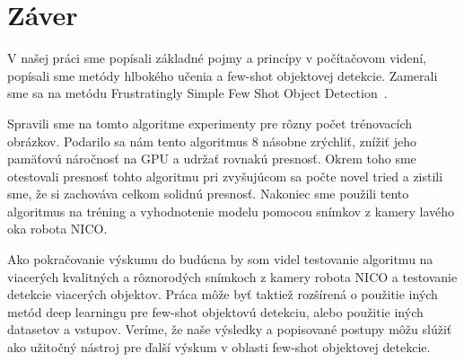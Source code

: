 \chapter*{Záver}\label{chap:conclusion}
V našej práci sme popísali základné pojmy a princípy v počítačovom videní, popísali sme metódy hlbokého učenia a few-shot objektovej detekcie. Zamerali sme sa na metódu Frustratingly Simple Few Shot Object Detection~\cite{FSFSODT}. 

Spravili sme na tomto algoritme experimenty pre rôzny počet trénovacích obrázkov. Podarilo sa nám tento algoritmus 8 násobne zrýchliť, znížiť jeho pamäťovú náročnosť na GPU a udržať rovnakú presnosť. Okrem toho sme otestovali presnosť tohto algoritmu pri zvyšujúcom sa počte novel tried a zistili sme, že si zachováva celkom solidnú presnosť. Nakoniec sme použili tento algoritmus na tréning a vyhodnotenie modelu pomocou snímkov z kamery lavého oka robota NICO.

Ako pokračovanie výskumu do budúcna by som videl testovanie algoritmu na viacerých kvalitných a rôznorodých snímkoch z kamery robota NICO a testovanie detekcie viacerých objektov. Práca môže byť taktiež rozšírená o použitie iných metód deep learningu pre few-shot objektovú detekciu, alebo použitie iných datasetov a vstupov. Veríme, že naše výsledky a popisované postupy môžu slúžiť ako užitočný nástroj pre ďalší výskum v oblasti few-shot objektovej detekcie.

